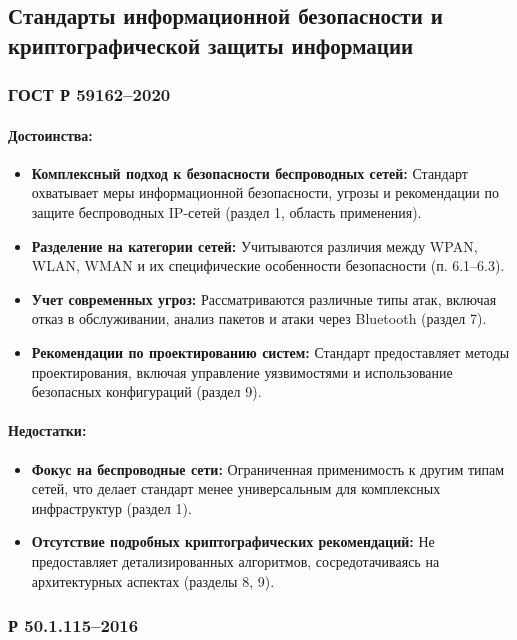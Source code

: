 \subsection{Стандарты информационной безопасности и криптографической защиты информации}


\subsubsection*{ГОСТ Р 59162–2020}
\paragraph{Достоинства:}
\begin{itemize}
\item \textbf{Комплексный подход к безопасности беспроводных сетей:} Стандарт охватывает меры информационной безопасности, угрозы и рекомендации по защите беспроводных IP-сетей (раздел 1, область применения).
\item \textbf{Разделение на категории сетей:} Учитываются различия между WPAN, WLAN, WMAN и их специфические особенности безопасности (п. 6.1–6.3).
\item \textbf{Учет современных угроз:} Рассматриваются различные типы атак, включая отказ в обслуживании, анализ пакетов и атаки через Bluetooth (раздел 7).
\item \textbf{Рекомендации по проектированию систем:} Стандарт предоставляет методы проектирования, включая управление уязвимостями и использование безопасных конфигураций (раздел 9).
\end{itemize}

\paragraph{Недостатки:}
\begin{itemize}
\item \textbf{Фокус на беспроводные сети:} Ограниченная применимость к другим типам сетей, что делает стандарт менее универсальным для комплексных инфраструктур (раздел 1).
\item \textbf{Отсутствие подробных криптографических рекомендаций:} Не предоставляет детализированных алгоритмов, сосредотачиваясь на архитектурных аспектах (разделы 8, 9).
\end{itemize}

\subsubsection*{Р 50.1.115–2016}
